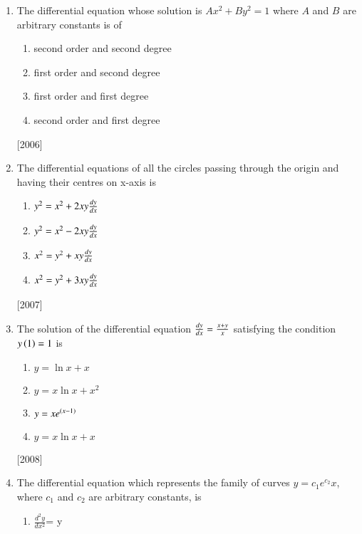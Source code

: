 \documentclass[journal]{IEEEtran}
\begin{document}
\begin{enumerate}
\item The differential equation whose solution is $Ax^2 + By^2 = 1$ where $A$ and $B$ are arbitrary constants is of 



\begin{multicols}{2}
\begin{enumerate}
    \item second order and second degree 
    \item first order and second degree 
    \item first order and first degree 
    \item second order and first degree 

\end{enumerate}
\end{multicols}
\hfill
{[2006]}
\item The differential equations of all the circles passing through the origin and having their centres on x-axis is
\begin{multicols}{2}
\begin{enumerate}
\item $ y^2=x^2 + 2xy\frac{d{y}}{d{x}} $
\item $ y^2=x^2 - 2xy\frac{d{y}}{d{x}}$
\item $ x^2=y^2 + xy\frac{d{y}}{d{x}}$
\item $ x^2 =y^2 + 3xy\frac{d{y}}{d{x}}$
\end{enumerate}
\end{multicols}
\hfill
{{[2007]}}




\item The solution of the differential equation $ \frac{d{y}}{d{x}}=\frac{x+y}{x}$ satisfying the condition $ y\left(1\right)=1 $ is
  \begin{multicols}{2}
    \begin{enumerate}
    \item $ y=  \ln{x}+x $
    \item $y=x\ln{x}+x^2$
    \item $ y=xe^{\left(x-1\right)} $
    \item $ y=x \ln{x}+ x$
       \end{enumerate}
   \end{multicols}
\hfill
{[2008]}


\item The differential equation which represents the family of curves $y= c{_1}e^{c_2}x$, where $c{_1}$ and $c{_2}$ are arbitrary constants, is
\begin{multicols}{2}
 \begin{enumerate}
    \item $\frac{d^{2}y}{dx^{2}}$= y


\end{enumerate}
\end{multicols}
\end{enumerate}
\end{document}
